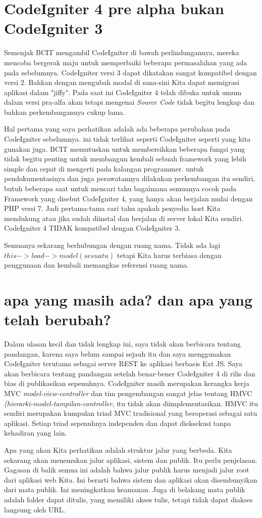 \section{CodeIgniter 4 pre alpha bukan CodeIgniter 3}
Semenjak BCIT mengambil CodeIgniter di bawah perlindungannya, mereka mencoba bergerak maju untuk memperbaiki beberapa permasalahan yang ada pada sebelumnya. CodeIgniter versi 3 dapat dikatakan sangat kompatibel dengan versi 2. Bahkan dengan mengubah modal di sana-sini Kita dapat memigrasi aplikasi dalam "jiffy". Pada saat ini CodeIgniter 4 telah dibuka untuk umum dalam versi pra-alfa akan tetapi mengenai \textit{Source Code } tidak begitu lengkap dan bahkan perkembangannya cukup lama. 
\par
Hal pertama yang saya perhatikan adalah ada beberapa perubahan pada CodeIgniter sebelumnya. ini tidak terlihat seperti CodeIgniter seperti yang kita gunakan juga. BCIT memutuskan untuk membersihkan beberapa fungsi yang tidak begitu penting untuk membangun kembali sebuah framework yang lebih simple dan cepat di mengerti pada kalangan programmer. untuk pendokumentasinya dan juga perawatannya dilakukan perkembangan itu sendiri, butuh beberapa saat untuk mencari tahu bagaimana semuanya cocok pada Framework yang disebut CodeIgniter 4, yang hanya akan berjalan mulai dengan PHP versi 7. Jadi pertama-tama cari tahu apakah penyedia host Kita mendukung atau jika sudah diinstal dan berjalan di server lokal Kita sendiri. CodeIgniter 4 TIDAK kompatibel dengan CodeIgniter 3.
\par
Semuanya sekarang berhubungan dengan ruang nama. Tidak ada lagi $ this-> load-> model (sesuatu)$  tetapi Kita harus terbiasa dengan penggunaan dan kembali memangkas referensi ruang nama.

\section{apa yang masih ada? dan apa yang telah berubah?}
Dalam ulasan kecil dan tidak lengkap ini, saya tidak akan berbicara tentang pandangan, karena saya belum sampai sejauh itu dan saya menggunakan CodeIgniter terutama sebagai server REST ke aplikasi berbasis Ext JS. Saya akan berbicara tentang pandangan setelah benar-bener CodeIgniter 4 di rilis dan bias di publikasikan sepenuhnya.
CodeIgniter masih merupakan kerangka kerja MVC \textit{model-view-controller} dan tim pengembangan sangat jelas tentang HMVC \textit{(hierarki-model-tampilan-controller}, itu tidak akan diimplementasikan. HMVC itu sendiri merupakan kumpulan triad MVC tradisional yang beroperasi sebagai satu aplikasi. Setiap triad sepenuhnya independen dan dapat dieksekusi tanpa kehadiran yang lain.
\par
Apa yang akan Kita perhatikan adalah struktur jalur yang berbeda. Kita sekarang akan menemukan jalur aplikasi, sistem dan publik. Itu perlu penjelasan. Gagasan di balik semua ini adalah bahwa jalur publik harus menjadi jalur root dari aplikasi web Kita. Ini berarti bahwa sistem dan aplikasi akan disembunyikan dari mata publik. Ini meningkatkan keamanan. Juga di belakang mata publik adalah folder dapat ditulis, yang memiliki akses tulis, tetapi tidak dapat diakses langsung oleh URL.

